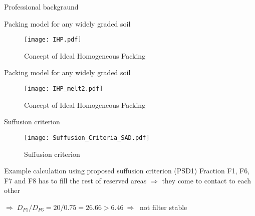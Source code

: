 \documentclass[10pt,xcolor=dvipsnames]{beamer}
\begin{document}
{\begin{frame}{Professional backgraund}
{
\usenavigationsymbolstemplate{}
\begin{frame}{Packing model for any widely graded soil}
\begin{figure}
	\centering
		\texttt{[image: IHP.pdf]}
	\caption{Concept of Ideal Homogeneous Packing}
	\label{fig:IHP}
\end{figure}
	
\end{frame}
}

{
\usenavigationsymbolstemplate{}
\begin{frame}{Packing model for any widely graded soil}
\begin{figure}
	\centering
		\texttt{[image: IHP\_melt2.pdf]}
	\caption{Concept of Ideal Homogeneous Packing}
	\label{fig:IHP}
\end{figure}
	
\end{frame}
}

\begin{frame}{Suffusion criterion}

\begin{figure}[H]
   \centering
\texttt{[image: Suffusion\_Criteria\_SAD.pdf]} 
\vspace{-0.3cm}
        \caption{Suffusion criterion}
        \label{fig:reserved_area_PSD1}
\end{figure}
\end{frame}

\begin{frame}{Example calculation using proposed suffusion criterion (PSD1)}
Fraction F1, F6, F7 and F8 has to fill the rest of reserved areas $\Rightarrow$ they come to contact to each other

$\Rightarrow \; D_{F1}/D_{F6}=20/0.75= 26.66 > 6.46\:  \Rightarrow\:$ not filter stable 





\end{frame}
\end{frame}}
\end{document}
